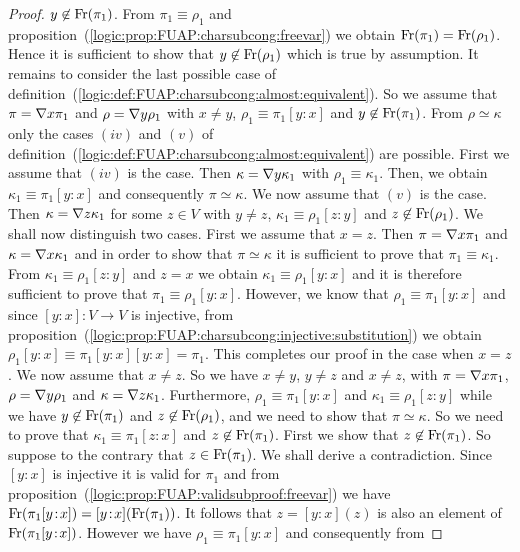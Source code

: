 \begin{proof}
$y\not\in\mbox{\rm Fr}(\pi_{1})$. From $\pi_{1}\equiv\rho_{1}$ and
proposition~(\ref{logic:prop:FUAP:charsubcong:freevar}) we obtain
$\mbox{\rm Fr}(\pi_{1})=\mbox{\rm Fr}(\rho_{1})$. Hence it is sufficient to show
that $y\not\in\mbox{\rm Fr}(\rho_{1})$ which is true by assumption. It
remains to consider the last possible case of
definition~(\ref{logic:def:FUAP:charsubcong:almost:equivalent}). So
we assume that $\pi=\mbox{$\nabla$} x\pi_{1}$ and $\rho=\mbox{$\nabla$} y\rho_{1}$ with
$x\neq y$, $\rho_{1}\equiv\pi_{1}[y\!:\!x]$ and
$y\not\in\mbox{\rm Fr}(\pi_{1})$. From $\rho\simeq\kappa$ only the cases
$(iv)$ and $(v)$ of
definition~(\ref{logic:def:FUAP:charsubcong:almost:equivalent}) are
possible. First we assume that $(iv)$ is the case. Then $\kappa=\mbox{$\nabla$}
y\kappa_{1}$ with $\rho_{1}\equiv\kappa_{1}$. Then, we obtain
$\kappa_{1}\equiv\pi_{1}[y\!:\!x]$ and consequently
$\pi\simeq\kappa$. We now assume that $(v)$ is the case. Then
$\kappa=\mbox{$\nabla$} z\kappa_{1}$ for some $z\in V$ with $y\neq z$,
$\kappa_{1}\equiv\rho_{1}[z\!:\!y]$ and $z\not\in\mbox{\rm Fr}(\rho_{1})$.
We shall now distinguish two cases. First we assume that $x=z$. Then
$\pi=\mbox{$\nabla$} x\pi_{1}$ and $\kappa=\mbox{$\nabla$} x\kappa_{1}$ and in order to
show that $\pi\simeq\kappa$ it is sufficient to prove that
$\pi_{1}\equiv\kappa_{1}$. From $\kappa_{1}\equiv\rho_{1}[z\!:\!y]$
and $z=x$ we obtain $\kappa_{1}\equiv\rho_{1}[y\!:\!x]$ and it is
therefore sufficient to prove that $\pi_{1}\equiv\rho_{1}[y\!:\!x]$.
However, we know that $\rho_{1}\equiv\pi_{1}[y\!:\!x]$ and since
$[y\!:\!x]:V\to V$ is injective, from
proposition~(\ref{logic:prop:FUAP:charsubcong:injective:substitution})
we obtain
$\rho_{1}[y\!:\!x]\equiv\pi_{1}[y\!:\!x][y\!:\!x]=\pi_{1}$. This
completes our proof in the case when $x=z$. We now assume that
$x\neq z$. So we have $x\neq y$, $y\neq z$ and $x\neq z$, with
$\pi=\mbox{$\nabla$} x\pi_{1}$, $\rho=\mbox{$\nabla$} y\rho_{1}$ and $\kappa=\mbox{$\nabla$}
z\kappa_{1}$. Furthermore, $\rho_{1}\equiv\pi_{1}[y\!:\!x]$ and
$\kappa_{1}\equiv\rho_{1}[z\!:\!y]$ while we have
$y\not\in\mbox{\rm Fr}(\pi_{1})$ and $z\not\in\mbox{\rm Fr}(\rho_{1})$, and we need
to show that $\pi\simeq\kappa$. So we need to prove that
$\kappa_{1}\equiv\pi_{1}[z\!:\!x]$ and $z\not\in\mbox{\rm Fr}(\pi_{1})$.
First we show that $z\not\in\mbox{\rm Fr}(\pi_{1})$. So suppose to the
contrary that $z\in\mbox{\rm Fr}(\pi_{1})$. We shall derive a contradiction.
Since $[y\!:\!x]$ is injective it is valid for $\pi_{1}$ and from
proposition~(\ref{logic:prop:FUAP:validsubproof:freevar}) we have
$\mbox{\rm Fr}(\pi_{1}[y\!:\!x]) = [y\!:\!x](\mbox{\rm Fr}(\pi_{1}))$. It follows
that $z=[y\!:\!x](z)$ is also an element of
$\mbox{\rm Fr}(\pi_{1}[y\!:\!x])$. However we have
$\rho_{1}\equiv\pi_{1}[y\!:\!x]$ and consequently from

\end{proof}
